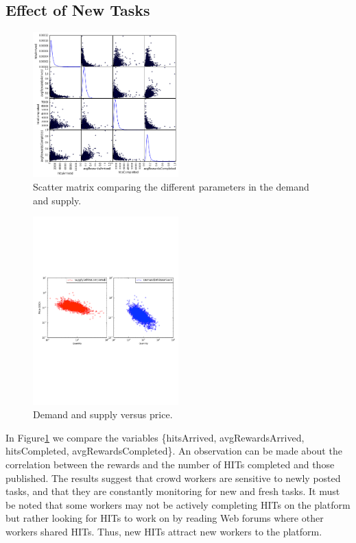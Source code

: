 \subsection{Effect of New Tasks}
\begin{figure}[ht]
	\centering
		\includegraphics[width=0.5\textwidth]{figures/scattermatrix}
	\caption{Scatter matrix comparing the different parameters in the demand and supply.}
	\label{fig:scatter_matrix}
\end{figure}
\begin{figure}[ht]
	\centering
		\includegraphics[width=0.5\textwidth]{figures/supply_demand}
	\caption{Demand and supply versus price.}
	\label{fig:dsup}
\end{figure}
In Figure\ref{fig:scatter_matrix} we compare  the variables \{hitsArrived, avgRewardsArrived, hitsCompleted, avgRewardsCompleted\}. An observation  can be made about the correlation between the rewards and the number of HITs completed and those published.
The results suggest that crowd workers are sensitive to newly posted tasks, and that they are constantly monitoring for new and fresh tasks.
It must be noted that some workers may not be actively completing HITs on the platform but rather looking for HITs to work on by reading Web forums where other workers shared HITs. Thus, new HITs attract new workers to the platform.

